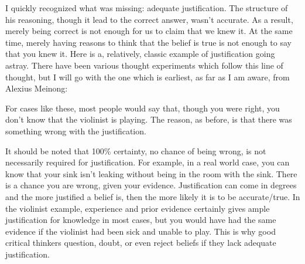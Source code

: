 
I quickly recognized what was missing: adequate \gls{justification}. The structure of his reasoning, though it lead to the correct answer, wasn't accurate. As a result, merely being correct is not enough for us to claim that we knew it. At the same time, merely having reasons to think that the belief is true is not enough to say that you knew it. Here is a, relatively, classic example of justification going astray. There have been various thought experiments which follow this line of thought, but I will go with the one which is earliest, as far as I am aware, from Alexius Meinong: 


For cases like these, most people would say that, though you were right, you don't know that the violinist is playing. The reason, as before, is that there was something wrong with the justification. 

It should be noted that 100\% certainty, no chance of being wrong, is not necessarily required for justification. For example, in a real world case, you can know that your sink isn't leaking without being in the room with the sink. There is a chance you are wrong, given your evidence. Justification can come in degrees and the more justified a belief is, then the more likely it is to be accurate/true. In the violinist example, experience and prior evidence certainly gives ample justification for knowledge in most cases, but you would have had the same evidence if the violinist had been sick and unable to play. This is why good critical thinkers question, doubt, or even reject beliefs if they lack adequate justification.

